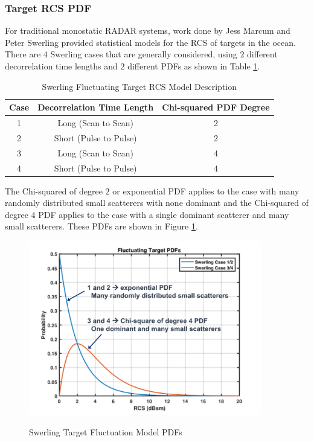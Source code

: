 \subsubsection{Target RCS PDF}
For traditional monostatic RADAR systems, work done by Jess Marcum and Peter Swerling provided statistical models for the RCS of targets in the ocean\cite{richards_radar}. There are $4$ Swerling cases that are generally considered, using $2$ different decorrelation time lengths and $2$ different PDFs as shown in Table \ref{env_tab:1}. 

\begin{table}[H]
  \begin{center}
      \renewcommand{\baselinestretch}{1} \small\normalsize
  \begin{quote}
    \caption[Swerling Fluctuating Target RCS Model Description]{Swerling Fluctuating Target RCS Model Description\label{env_tab:1}}
  \end{quote}
  \begin{tabular} {|c | c | c |}
    \hline
  \bf{Case} & \bf{Decorrelation Time Length} & \bf{Chi-squared PDF Degree} \\ \hline
  1 &Long (Scan to Scan) &2 \\ \hline
  2 &Short (Pulse to Pulse) &2 \\ \hline
  3 &Long (Scan to Scan) &4 \\ \hline
  4 &Short (Pulse to Pulse) &4 \\ \hline
\end{tabular}
\end{center}
\end{table}
\renewcommand{\baselinestretch}{2} \small\normalsize
The Chi-squared of degree $2$ or exponential PDF applies to the case with many randomly distributed small scatterers with none dominant and the Chi-squared of degree $4$ PDF applies to the case with a single dominant scatterer and many small scatterers. These PDFs are shown in Figure \ref{env_fig:4}.
\begin{figure}[H]
  \begin{center}
\includegraphics[width=4in]{../media/multistatic/swerling_pdfs.png}
  \end{center}
  \renewcommand{\baselinestretch}{1} \small\normalsize
  \begin{quote}
    \caption[Swerling Target Fluctuation Model PDFs]{Swerling Target Fluctuation Model PDFs\label{env_fig:4}}
  \end{quote}
\end{figure}
